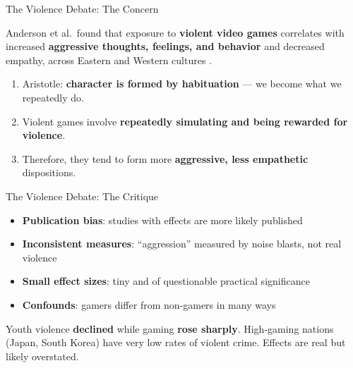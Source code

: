 \documentclass[aspectratio=169,11pt]{beamer}
\begin{document}
\begin{frame}[t]{The Violence Debate: The Concern}
\begin{conceptbox}
\footnotesize
Anderson et al.\ found that exposure to \textbf{violent video games} correlates with increased \textbf{aggressive thoughts, feelings, and behavior} and decreased empathy, across Eastern and Western cultures \parencite{anderson_violent_video_games}.
\end{conceptbox}

\vspace{0.15cm}
\begin{argumentbox}
\footnotesize
\begin{enumerate}
    \item Aristotle: \textbf{character is formed by habituation} --- we become what we repeatedly do.
    \item Violent games involve \textbf{repeatedly simulating and being rewarded for violence}.
    \item Therefore, they tend to form more \textbf{aggressive, less empathetic} dispositions.
\end{enumerate}
\end{argumentbox}
\end{frame}

\begin{frame}[t]{The Violence Debate: The Critique}
\begin{objectionbox}
\footnotesize
\begin{itemize}
    \item \textbf{Publication bias}: studies with effects are more likely published
    \item \textbf{Inconsistent measures}: ``aggression'' measured by noise blasts, not real violence
    \item \textbf{Small effect sizes}: tiny and of questionable practical significance
    \item \textbf{Confounds}: gamers differ from non-gamers in many ways
\end{itemize}
\end{objectionbox}

\vspace{0.15cm}
\begin{probox}
\footnotesize
Youth violence \textbf{declined} while gaming \textbf{rose sharply}. High-gaming nations (Japan, South Korea) have very low rates of violent crime. Effects are real but likely overstated.
\end{probox}
\end{frame}
\end{document}
